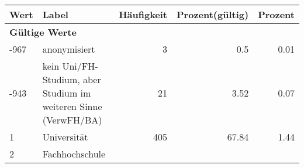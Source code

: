      \begin{longtable}{lXrrr}
     \toprule
     \textbf{Wert} & \textbf{Label} & \textbf{Häufigkeit} & \textbf{Prozent(gültig)} & \textbf{Prozent} \\
     \endhead
     \midrule
     \multicolumn{5}{l}{\textbf{Gültige Werte}}\\

     -967 &
     \multicolumn{1}{X}{ anonymisiert   } &


       \num{3} &
       \num[round-mode=places,round-precision=2]{0.5} &
         \num[round-mode=places,round-precision=2]{0.01} \\

     -943 &
     \multicolumn{1}{X}{ kein Uni/FH-Studium, aber Studium im weiteren Sinne (VerwFH/BA)   } &


       \num{21} &
       \num[round-mode=places,round-precision=2]{3.52} &
         \num[round-mode=places,round-precision=2]{0.07} \\

     1 &
     \multicolumn{1}{X}{ Universität   } &


       \num{405} &
       \num[round-mode=places,round-precision=2]{67.84} &
         \num[round-mode=places,round-precision=2]{1.44} \\

     2 &
     \multicolumn{1}{X}{ Fachhochschule   } &



\end{longtable}
